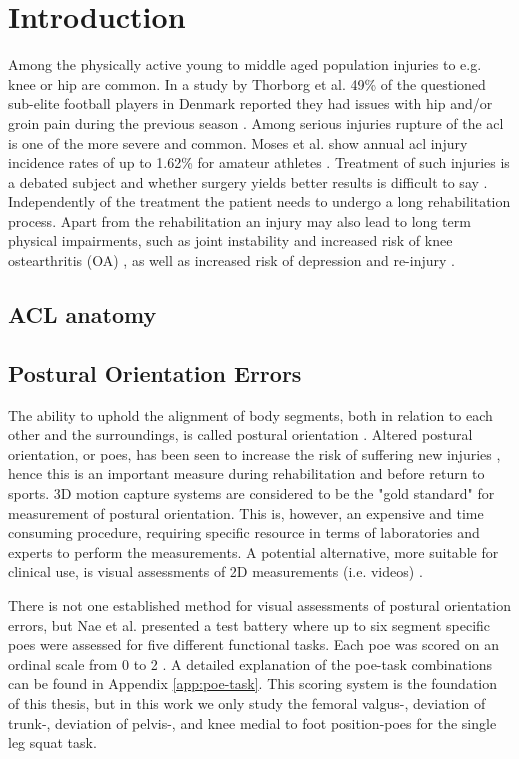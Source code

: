 \chapter{Introduction}
Among the physically active young to middle aged population injuries to e.g. knee or hip are common. In a study by Thorborg et al. 49\% of the questioned sub-elite football players in Denmark reported they had issues with hip and/or groin pain during the previous season \cite{Thorborg2017}. Among serious injuries rupture of the \gls{acl} is one of the more severe and common. Moses et al. show annual \gls{acl} injury incidence rates of up to 1.62\% for amateur athletes \cite{Moses2012}. Treatment of such injuries is a debated subject and whether surgery yields better results is difficult to say \cite{Krause2018, Monk2016}. Independently of the treatment the patient needs to undergo a long rehabilitation process.
Apart from the rehabilitation an injury may also lead to long term physical impairments, such as joint instability \cite{Ageberg2002} and increased risk of knee ostearthritis (OA) \cite{Lohmander2007}, as well as increased risk of depression \cite{Crichlow2006} and re-injury \cite{Paterno2012}.

\section{ACL anatomy}

\section{Postural Orientation Errors}
The ability to uphold the alignment of body segments, both in relation to each other and the surroundings, is called postural orientation \cite{Horak2006}. Altered postural orientation, or \glspl{poe}, has been seen to increase the risk of suffering new injuries \cite{Hewett2005}, hence this is an important measure during rehabilitation and before return to sports. 3D motion capture systems are considered to be the "gold standard" for measurement of postural orientation. This is, however, an expensive and time consuming procedure, requiring specific resource in terms of laboratories and experts to perform the measurements. A potential alternative, more suitable for clinical use, is visual assessments of 2D measurements (i.e. videos) \cite{Nae2020}.

There is not one established method for visual assessments of postural orientation errors, but Nae et al. presented a test battery where up to six segment specific \glspl{poe} were assessed for five different functional tasks. Each \gls{poe} was scored on an ordinal scale from 0 to 2 \cite{Nae2017, Nae2020b}. A detailed explanation of the \gls{poe}-task combinations can be found in Appendix \ref{app:poe-task}. This scoring system is the foundation of this thesis, but in this work we only study the femoral valgus-, deviation of trunk-, deviation of pelvis-, and knee medial to foot position-\glspl{poe} for the single leg squat task.


